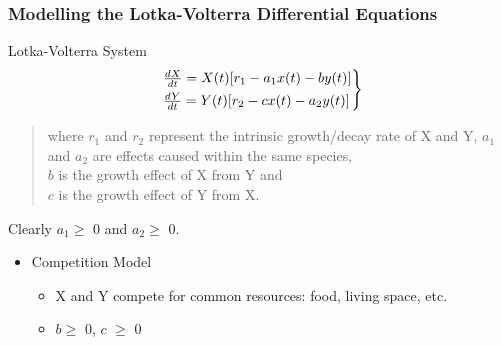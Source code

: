 \documentclass[xcolor={svgnames},hyperref={colorlinks,allcolors=Blue}]{beamer}
\begin{document}
\begin{frame}
\frametitle{Modelling the Lotka-Volterra Differential Equations}

\begin{block}{Lotka-Volterra System}
\begin{equation}\label{eq:one}
	\begin{rcases}
		~\frac{dX}{dt} = X(t)[r_1-a_{1}x(t) - by(t)] \\
		~\frac{dY}{dt} = Y(t)[r_2-cx(t)-a_{2}y(t)] 
	\end{rcases}
\end{equation}
\begin{quote}
where $r_1$ and $r_2$ represent the intrinsic growth/decay rate of X and Y, $a_{1}$ and $a_{2}$ are effects caused within the same species, \\ $b$ is the growth effect of X from Y and \\ $c$ is the growth effect of Y from X. 
\end{quote}
\end{block}

Clearly $a_1 \geqslant$ 0 and $a_2 \geqslant$ 0.
\begin{itemize}
\item Competition Model
	\begin{itemize}
		\item X and Y compete for common resources: food, living space, etc.
		\item $b \geqslant$ 0, $c$ $\geqslant$ 0
		\end{itemize}
		
\end{itemize}
\end{frame}
\end{document}
